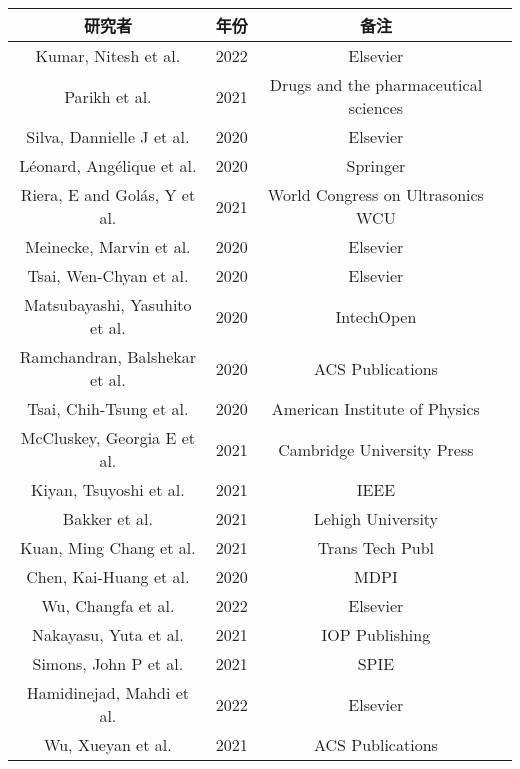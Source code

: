 \begin{center}
\begin{tabular}{cccc}
\hline
研究者 & 年份 & 备注 \\
\hline
Kumar, Nitesh et al. \cite{kumar2022thermalhydraulic} & 2022 & Elsevier \\
Parikh et al. \cite{parikh2005handbook} & 2021 & Drugs and the pharmaceutical sciences \\
Silva, Dannielle J et al. \cite{silva2014modeling} & 2020 & Elsevier \\
L{\'e}onard, Ang{\'e}lique  et al. \cite{leonard2008characterization} & 2020 & Springer \\
Riera, E and Gol{\'a}s, Y et al. \cite{riera2003generation} & 2021 & World Congress on Ultrasonics WCU \\
Meinecke, Marvin et al. \cite{meinecke2020imaging} & 2020 & Elsevier \\
Tsai, Wen-Chyan et al. \cite{tsai2016liposomal} & 2020 & Elsevier \\
Matsubayashi, Yasuhito et al. \cite{matsubayashi2019dusty} & 2020 & IntechOpen \\
Ramchandran, Balshekar et al. \cite{ramchandran1992dynamic} & 2020 & ACS Publications \\
Tsai, Chih-Tsung et al. \cite{tsai2008low} & 2020 & American Institute of Physics \\
McCluskey, Georgia E et al. \cite{mccluskey2009synthesis} & 2021 & Cambridge University Press \\
Kiyan, Tsuyoshi et al. \cite{kiyan2005pulsed} & 2021 & IEEE \\
Bakker et al. \cite{bakker1997surface} & 2021 & Lehigh University \\
Kuan, Ming Chang et al. \cite{kuan2011low} & 2021 & Trans Tech Publ \\
Chen, Kai-Huang et al. \cite{chen2017bipolar} & 2020 & MDPI \\
Wu, Changfa et al. \cite{wu2022recycling} & 2022 & Elsevier \\
Nakayasu, Yuta et al. \cite{nakayasu2015controllable} & 2021 & IOP Publishing \\
Simons, John P et al. \cite{simons2001image} & 2021 & SPIE \\
Hamidinejad, Mahdi et al. \cite{hamidinejad2022electrically} & 2022 & Elsevier \\
Wu, Xueyan et al. \cite{wu2008synthesis} & 2021 & ACS Publications \\
\hline
\end{tabular}
\end{center}